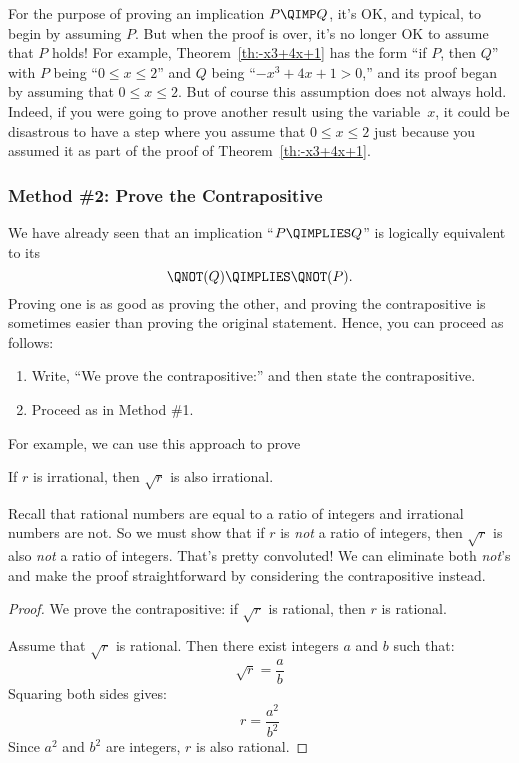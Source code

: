 For the purpose of proving an implication $P \QIMP Q$, it's OK, and
typical, to begin by assuming $P$.  But when the proof is over, it's
no longer OK to assume that $P$ holds!  For example,
Theorem~\ref{th:-x3+4x+1} has the form ``if $P$, then $Q$'' with $P$
being ``$0 \le x \le 2$'' and $Q$ being ``$-x^3 + 4x + 1 > 0$,'' and
its proof began by assuming that $0 \le x \le 2$.  But of course this
assumption does not always hold.  Indeed, if you were going to prove
another result using the variable~$x$, it could be disastrous to have
a step where you assume that $0 \le x \le 2$ just because you assumed
it as part of the proof of Theorem~\ref{th:-x3+4x+1}.

\subsubsection{Method \#2: Prove the Contrapositive}

We have already seen that an implication ``$P \QIMPLIES Q$'' is
logically equivalent to its 
\[
\QNOT(Q) \QIMPLIES \QNOT(P).
\]
Proving one is as good as proving the other, and proving the
contrapositive is sometimes easier than proving the original statement.
Hence, you can proceed as follows:
%
\begin{enumerate}
\item Write, ``We prove the contrapositive:'' and then state the
contrapositive.
\item Proceed as in Method \#1.
\end{enumerate}

For example, we can use this approach to prove
\begin{theorem}
If $r$ is irrational, then $\sqrt{r}$ is also irrational.
\end{theorem}

Recall that rational numbers are equal to a ratio of integers and
irrational numbers are not.  So we must show that if $r$ is \textit{not} a
ratio of integers, then $\sqrt{r}$ is also \textit{not} a ratio of
integers.  That's pretty convoluted!  We can eliminate both \emph{not}'s
and make the proof straightforward by considering the contrapositive
instead.

\begin{proof}
We prove the contrapositive: if $\sqrt{r}$ is rational, then $r$ is
rational.

Assume that $\sqrt{r}$ is rational.  Then there exist integers $a$ and $b$
such that:
%
\[
\sqrt{r} = \frac{a}{b}
\]
%
Squaring both sides gives:
%
\[
r  = \frac{a^2}{b^2}
\]
%
Since $a^2$ and $b^2$ are integers, $r$ is also rational.
\end{proof}

